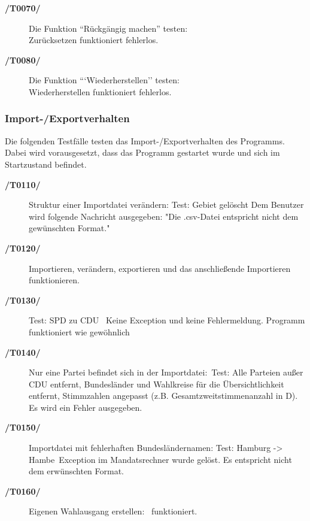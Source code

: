 \documentclass[12pt,a4paper,titlepage]{article}
\begin{document}
\begin{description}
	\item[\textbf{/T0070/}] Die Funktion ``Rückgängig machen'' testen: \\
	Zurücksetzen funktioniert fehlerlos.
	\item[\textbf{/T0080/}] Die Funktion ```Wiederherstellen'' testen: \\
	Wiederherstellen funktioniert fehlerlos.
	

\end{description}
\subsubsection{Import-/Exportverhalten}
Die folgenden Testfälle testen das Import-/Exportverhalten des Programms. Dabei wird vorausgesetzt, dass das Programm gestartet wurde und sich im Startzustand befindet. 
\begin{description}
	\item[\textbf{/T0110/}] Struktur einer Importdatei verändern: \newline
	Test: Gebiet gelöscht \newline
	Dem Benutzer wird folgende Nachricht ausgegeben: "Die .csv-Datei entspricht nicht dem gewünschten Format."\\
	\item[\textbf{/T0120/}] 
	Importieren, verändern, exportieren und das anschließende Importieren funktionieren.\\ 
	\item[\textbf{/T0130/}] 
	Test: SPD zu CDU \
	Keine Exception und keine Fehlermeldung. Programm funktioniert wie gewöhnlich
	\item[\textbf{/T0140/}] Nur eine Partei befindet sich in der Importdatei:\
	Test: Alle Parteien außer CDU entfernt, Bundesländer und Wahlkreise für die Übersichtlichkeit entfernt, Stimmzahlen angepasst (z.B. Gesamtzweitstimmenanzahl in D). \\
	Es wird ein Fehler ausgegeben.\\
	 \newline

	\item[\textbf{/T0150/}] Importdatei mit fehlerhaften Bundesländernamen:
	Test: Hamburg -> Hambe\
	Exception im Mandatsrechner wurde gelöst. Es entspricht nicht dem erwünschten Format.
	\item[\textbf{/T0160/}] Eigenen Wahlausgang erstellen: \
	funktioniert.
\end{description}
\end{document}
